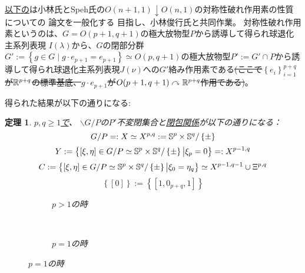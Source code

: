 \documentclass[a4paper,10pt]{article} %
\newcommand{\assign}{:=}
\newtheorem{theorem}{定理}
\begin{document}
\uline{以下の}は小林氏とSpeh氏の$O(n+1,1)\downarrow O(n,1)$の対称性破れ作用素の性質についての
論文\cite{kobayashi2015symmetry}を一般化する
目指し、小林俊行氏と共同作業。
対称性破れ作用素というのは、$G=O(p+1,q+1)$の極大放物型$P$から誘導して得られ球退化主系列表現
$I(\lambda)$から、$G$の閉部分群$G':=\left\{ g\in G\mid g\cdot e_{p+1}=e_{p+1} \right\}\simeq O(p,q+1)$の極大放物型$P':=G'\cap P$から誘導して得られ球退化主系列表現$J(\nu)
$への$G'$絡み作用素である\sout{(ここで$\left\{ e_i \right\}_{i=1}^{p+q}$が$\mathbb{R}^{p+q}$の標準基底、$g\cdot e_{p+1}$が$O(p+1,q+1)\curvearrowright\mathbb{R}^{p+q}$作用である)}。

得られた結果が以下の通りになる:

\begin{theorem}
$p, q \geqslant 1$\uline{で}、
  $\backslash G/P$の$P'$不変閉集合と\uline{閉包関係}が以下の通りになる：\\
  \[G/P=:X\simeq X^{p,q}:=\mathbb{S}^p\times\mathbb{S}^q/\left\{ \pm \right\}\]
  \[Y:=\left\{[\xi,\eta]\in G/P\simeq \mathbb{S}^p\times\mathbb{S}^q/\left\{ \pm\right\}\big| \xi_{p}=0\right\}=:X^{p-1,q}\]
  \[C:=\left\{[\xi,\eta]\in G/P\simeq \mathbb{S}^p\times\mathbb{S}^q/\left\{ \pm\right\}\big| \xi_{0}=\eta_q\right\}\simeq X^{p-1,q-1}\cup\Xi^{p,q}\]
  \[\left\{ [0] \right\}:=\left\{ [1,0_{p+q},1] \right\}\]
  \begin{figure}[H]
    \centering
    \begin{subfigure}{0.3\textwidth}
	\caption{$p>1$の時}
    \end{subfigure}
    ~ %
    \begin{subfigure}{0.3\textwidth}
	\raisebox{40mm}
	{}
	\caption{$p=1$の時}
    \end{subfigure}
\end{figure}
\end{theorem}
\end{document}
